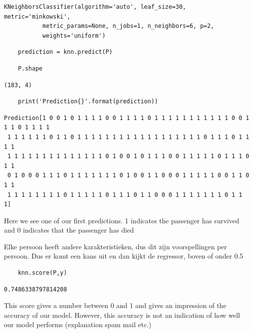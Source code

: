 \documentclass[11pt]{article}
\begin{document}
\begin{verbatim}
KNeighborsClassifier(algorithm='auto', leaf_size=30, metric='minkowski',
           metric_params=None, n_jobs=1, n_neighbors=6, p=2,
           weights='uniform')
\end{verbatim}

\begin{verbatim}
    prediction = knn.predict(P)
\end{verbatim}

\begin{verbatim}
    P.shape
\end{verbatim}

\begin{verbatim}
(183, 4)
\end{verbatim}

\begin{verbatim}
    print('Prediction{}'.format(prediction))
\end{verbatim}

\begin{verbatim}
Prediction[1 0 0 1 0 1 1 1 1 0 0 1 1 1 1 0 1 1 1 1 1 1 1 1 1 1 1 0 0 1 1 1 0 1 1 1 1
 1 1 1 1 1 1 0 1 1 0 1 1 1 1 1 1 1 1 1 1 1 1 1 1 1 1 1 1 0 1 1 1 0 1 1 1 1
 1 1 1 1 1 1 1 1 1 1 1 1 1 1 0 1 0 0 1 0 1 1 1 0 0 1 1 1 1 1 0 1 1 1 0 1 1
 0 1 0 0 0 1 1 1 0 1 1 1 1 1 1 1 0 1 0 0 1 1 0 0 0 1 1 1 1 1 0 0 1 1 0 1 1
 1 1 1 1 1 1 1 1 0 1 1 1 1 1 0 1 1 1 0 1 1 0 0 0 1 1 1 1 1 1 1 0 1 1 1]

\end{verbatim}

Here we see one of our first predictions. 1 indicates the passenger has
survived and 0 indicates that the passenger has died

Elke persoon heeft andere karakteristieken, dus dit zijn voorspellingen
per persoon. Dus er komt een kans uit en dan kijkt de regressor, boven
of onder 0.5

\begin{verbatim}
    knn.score(P,y)
\end{verbatim}

\begin{verbatim}
0.7486338797814208
\end{verbatim}

This score gives a number between 0 and 1 and gives an impression of the
accuracy of our model. However, this accuracy is not an indication of
how well our model performs (explanation spam mail etc.)
\end{document}
